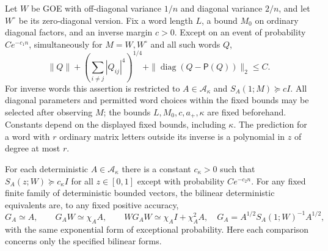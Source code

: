 \begin{lemma}
\label{prof:endpoint-words}
Let $W$ be GOE with off-diagonal variance $1/n$ and diagonal variance
$2/n$, and let $W^\circ$ be its zero-diagonal version.  Fix a word length
$L$, a bound $M_0$ on ordinary diagonal factors, and an inverse margin
$c>0$.  Except on an event of probability $Ce^{-c_1n}$, simultaneously
for $M=W,W^\circ$ and all such words $Q$,
\[
 \|Q\|+
 \left(\sum_{i\ne j}|Q_{ij}|^4\right)^{1/4}
 +\|\operatorname{diag}(Q-\mathsf P(Q))\|_2\le C.
\]
For inverse words this assertion is restricted to $A\in\mathcal A_\kappa$
and $S_A(1;M)\succeq cI$. All diagonal parameters and permitted
word choices within the fixed bounds may be selected after observing
$M$; the bounds $L,M_0,c,a_+,\kappa$ are fixed beforehand.
Constants depend on the displayed fixed bounds, including $\kappa$.
The prediction for a word with $r$ ordinary matrix letters outside its
inverse is a polynomial in $z$ of degree at most $r$.

For each deterministic $A\in\mathcal A_\kappa$ there is a constant
$c_\kappa>0$ such that
$S_A(z;W)\succeq c_\kappa I$ for all $z\in[0,1]$ except with probability
$Ce^{-c_2n}$.  For any fixed finite family of deterministic bounded vectors,
the bilinear deterministic equivalents are, to any fixed positive
accuracy,
\[
 G_A\simeq A,\qquad G_AW\simeq\chi_A A,\qquad
 WG_AW\simeq\chi_A I+\chi_A^2 A,
 \quad G_A=A^{1/2}S_A(1;W)^{-1}A^{1/2},
\]
with the same exponential form of exceptional probability.  Here each
comparison concerns only the specified bilinear forms.
\end{lemma}

